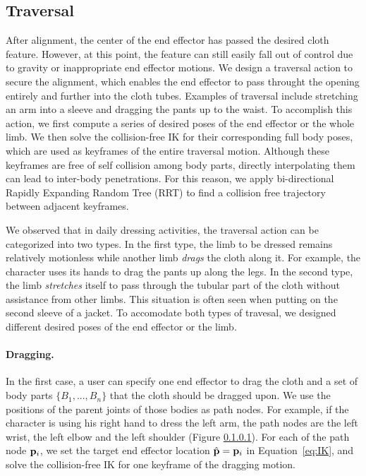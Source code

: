 \subsection{Traversal}
After alignment, the center of the end effector has passed the desired cloth feature. However, at this point, the feature can still easily fall out of control due to gravity or inappropriate end effector motions. We design a traversal action to secure the alignment, which enables the end effector to pass throught the opening entirely and further into the cloth tubes. Examples of traversal include stretching an arm into a sleeve and dragging the pants up to the waist. To accomplish this action, we first compute a series of desired poses of the end effector or the whole limb. We then solve the collision-free IK for their corresponding full body poses, which are used as keyframes of the entire traversal motion. Although these keyframes are free of self collision among body parts, directly interpolating them can lead to inter-body penetrations. For this reason, we apply bi-directional Rapidly Expanding Random Tree (RRT) \cite{} to find a collision free trajectory between adjacent keyframes.

We observed that in daily dressing activities, the traversal action can be categorized into two types. In the first type, the limb to be dressed remains relatively motionless while another limb \emph{drags} the cloth along it. For example, the character uses its hands to drag the pants up along the legs. In the second type, the limb \emph{stretches} itself to pass through the tubular part of the cloth without assistance from other limbs. This situation is often seen when putting on the second sleeve of a jacket. To accomodate both types of travesal, we designed different desired poses of the end effector or the limb.

\paragraph{Dragging.} In the first case, a user can specify one end effector to drag the cloth and a set of body parts $\{B_1 ,..., B_n\}$ that the cloth should be dragged upon. We use the positions of the parent joints of those bodies as path nodes. For example, if the character is using his right hand to dress the left arm, the path nodes are the left wrist, the left elbow and the left shoulder (Figure \ref{}). For each of the path node $\mathbf{p}_i$, we set the target end effector location $\hat{\mathbf{p}}=\mathbf{p}_i$ in Equation~\ref{eq:IK}, and solve the collision-free IK for one keyframe of the dragging motion. 

